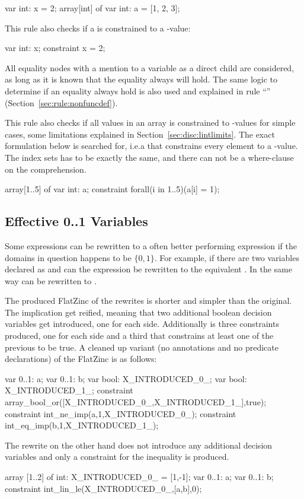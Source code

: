 \documentclass[a4paper,12pt]{article}
\newcommand{\ruleref}[1]{``\nameref{sec:rule:#1}'' (Section~\ref{sec:rule:#1})}
\begin{document}
\begin{mznnobreak}
var int: x = 2;
array[int] of var int: a = [1, 2, 3];
\end{mznnobreak}

This rule also checks if a  is constrained to a -value:

\begin{mznnobreak}
var int: x;
constraint x = 2;
\end{mznnobreak}

All equality nodes with a mention to a variable as a direct child are considered, as long
as it is known that the equality always will hold. The same logic to determine if an
equality always hold is also used and explained in rule \ruleref{nonfuncdef}.

This rule also checks if all values in an array is constrained to -values for
simple cases, some limitations explained in Section~\ref{sec:disc:lintlimits}. The exact
formulation below is searched for, i.e.\@ a  that constrains every element to a
-value. The index sets has to be exactly the same, and there can not be a
where-clause on the comprehension.

\begin{mznnobreak}
array[1..5] of var int: a;
constraint forall(i in 1..5)(a[i] = 1);
\end{mznnobreak}

\subsection{Effective 0..1 Variables}\label{sec:rule:zeroone}
Some expressions can be rewritten to a often better performing expression if the domains in
question happens to be $\{0,1\}$. For example, if there are two variables declared as
 and  can the expression  be rewritten
to the equivalent . In the same way can  be rewritten to .

The produced FlatZinc of the rewrites is shorter and simpler than the original. The
implication get reified, meaning that two additional boolean decision variables get
introduced, one for each side. Additionally is three constraints produced, one for each
side and a third that constrains at least one of the previous to be true. A cleaned up
variant (no annotations and no predicate declarations) of the FlatZinc is as follows:
\begin{mznnobreak}
var 0..1: a;
var 0..1: b;
var bool: X_INTRODUCED_0_;
var bool: X_INTRODUCED_1_;
constraint array_bool_or([X_INTRODUCED_0_,X_INTRODUCED_1_],true);
constraint int_ne_imp(a,1,X_INTRODUCED_0_);
constraint int_eq_imp(b,1,X_INTRODUCED_1_);
\end{mznnobreak}
The rewrite on the other hand does not introduce any additional decision variables and
only a constraint for the inequality is produced.
\begin{mznnobreak}
array [1..2] of int: X_INTRODUCED_0_ = [1,-1];
var 0..1: a;
var 0..1: b;
constraint int_lin_le(X_INTRODUCED_0_,[a,b],0);
\end{mznnobreak}
\end{document}
